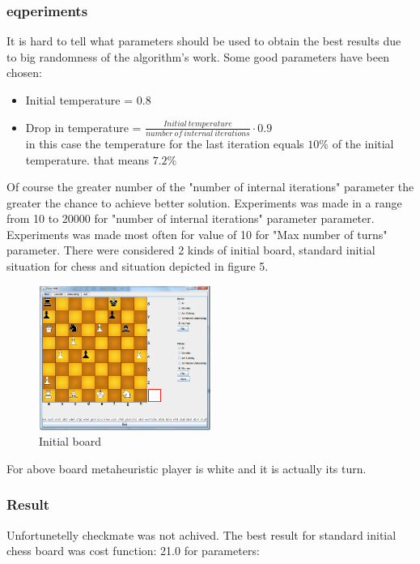 \documentclass[pdftex]{article}
\begin{document}
\subsubsection{eqperiments}
It is hard to tell what parameters should be used to obtain the best results due to big randomness of the algorithm's work. Some good parameters have been chosen:
\begin{itemize}
	\item Initial temperature = 0.8 \hfill \\

 	\item Drop in temperature = $\frac{Initial \: temperature}{number \: of \: internal \: iterations} \cdot 0.9$ \hfill \\
 	
in this case the temperature for the last iteration equals $10\%$ of the initial temperature. that means $7.2\%$
\end{itemize}
Of course the greater number of the "number of internal iterations" parameter the greater the chance to achieve better solution. Experiments was made in a range from 10 to 20000 for "number of internal iterations" parameter parameter.
Experiments was made most often for value of 10 for "Max number of turns" parameter. There were considered 2 kinds of initial board, standard initial situation for chess and situation depicted in figure 5.

\begin{figure}[!htb]
	\centering
	\includegraphics[width=0.5\textwidth]{annealing/board.png} 
	\caption{Initial board}
	\label{fig:initialBoard}
\end{figure}

For above board metaheuristic player is white and it is actually its turn.
 
\subsubsection{Result}
Unfortunetelly checkmate was not achived. The best result for standard initial chess board was cost function: 21.0 for parameters:
\end{document}
